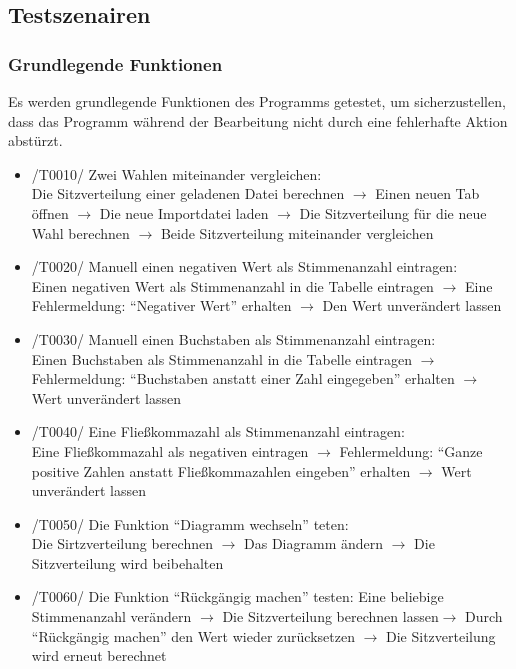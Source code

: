 \documentclass[10pt,a4paper]{article}
\begin{document}
\subsection{Testszenairen}
\subsubsection{Grundlegende Funktionen}
Es werden grundlegende Funktionen des Programms getestet, um sicherzustellen, dass das Programm während der Bearbeitung nicht durch eine fehlerhafte Aktion abstürzt.
\begin{itemize}
	\item /T0010/ Zwei Wahlen miteinander vergleichen: \\
	Die Sitzverteilung einer geladenen Datei berechnen $\rightarrow$ Einen neuen Tab öffnen $\rightarrow$ Die neue Importdatei laden $\rightarrow$ Die Sitzverteilung für die neue Wahl berechnen $\rightarrow$ Beide Sitzverteilung miteinander vergleichen
	\item /T0020/ Manuell einen negativen Wert als Stimmenanzahl eintragen: \\
	Einen negativen Wert als Stimmenanzahl in die Tabelle eintragen $\rightarrow$ Eine Fehlermeldung: ``Negativer Wert'' erhalten $\rightarrow$ Den Wert unverändert lassen
	\item /T0030/ Manuell einen Buchstaben als Stimmenanzahl eintragen: \\
	Einen Buchstaben als Stimmenanzahl in die Tabelle eintragen $\rightarrow$ Fehlermeldung: ``Buchstaben anstatt einer Zahl eingegeben'' erhalten $\rightarrow$ Wert unverändert lassen \\
	\item /T0040/ Eine Fließkommazahl als Stimmenanzahl eintragen: \\
	Eine Fließkommazahl als negativen eintragen $\rightarrow$ Fehlermeldung: ``Ganze positive Zahlen anstatt Fließkommazahlen eingeben'' erhalten $\rightarrow$ Wert unverändert lassen \\ 
	\item /T0050/ Die Funktion ``Diagramm wechseln'' teten:\\
	Die Sirtzverteilung berechnen $\rightarrow$ Das Diagramm ändern $\rightarrow$ Die Sitzverteilung wird beibehalten
	\item /T0060/ Die Funktion ``Rückgängig machen'' testen:
	Eine beliebige Stimmenanzahl verändern $\rightarrow$ Die Sitzverteilung berechnen lassen$\rightarrow$ Durch ``Rückgängig machen'' den Wert wieder zurücksetzen $\rightarrow$ Die Sitzverteilung wird erneut berechnet
\end{itemize}
\end{document}
